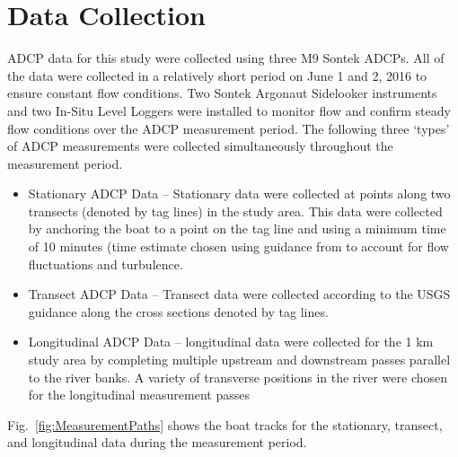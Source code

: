 \documentclass[Journal,letterpaper,BackFigs]{ascelike-new}
\begin{document}
\section{Data Collection}
ADCP data for this study were collected using three M9 Sontek ADCPs. All of the data were collected in a relatively short period on June 1 and 2, 2016 to ensure constant flow conditions. Two Sontek Argonaut Sidelooker instruments and two In-Situ Level Loggers were installed to monitor flow and confirm steady flow conditions over the ADCP measurement period. The following three ‘types’ of ADCP measurements were collected simultaneously throughout the measurement period.
\begin{itemize}
\item 
Stationary ADCP Data – Stationary data were collected at points along two transects (denoted by tag lines) in the study area. This data were collected by anchoring the boat to a point on the tag line and using a minimum time of 10 minutes (time estimate chosen using guidance from  to account for flow fluctuations and turbulence.
\item Transect ADCP Data – Transect data were collected according to the USGS guidance along the cross sections denoted by tag lines.
\item Longitudinal ADCP Data – longitudinal data were collected for the 1 km study area by completing multiple upstream and downstream passes parallel to the river banks. A variety of transverse positions in the river were chosen for the longitudinal measurement passes
\end{itemize}
Fig.~\ref{fig:MeasurementPaths} shows the boat tracks for the stationary, transect, and longitudinal data during the measurement period.
\end{document}
